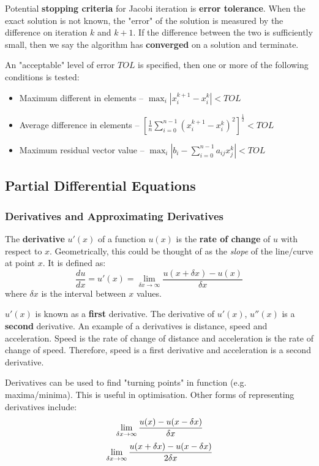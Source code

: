 \documentclass{article}
\begin{document}
Potential \textbf{stopping criteria} for Jacobi iteration is \textbf{error tolerance}. When the exact solution is not known, the "error" of the solution is measured by the difference on iteration $k$ and $k+1$. If the difference between the two is sufficiently small, then we say the algorithm has \textbf{converged} on a solution and terminate.

An "acceptable" level of error $TOL$ is specified, then one or more of the following conditions is tested:
\begin{itemize}
	\item Maximum different in elements -- $\max_{i} |x_i^{k+1} - x_i^k| < TOL$
	\item Average difference in elements -- $[\frac{1}{n} \sum_{i=0}^{n - 1} (x_i^{k + 1} - x_i^k)^2 ]^{\frac{1}{2}} < TOL$
	\item Maximum residual vector value -- $\max_{i} |b_i - \sum_{i=0}^{n - 1} { a_{ij}x_j^k } | < TOL$
\end{itemize}

\subsection{Partial Differential Equations}

\subsubsection{Derivatives and Approximating Derivatives}
The \textbf{derivative} $u'(x)$ of a function $u(x)$ is the \textbf{rate of change} of $u$ with respect to $x$. Geometrically, this could be thought of as the \textit{slope} of the line/curve at point $x$. It is defined as:
\begin{equation}
	\frac{du}{dx} = u'(x) = \lim_{\delta x \rightarrow \infty} \frac{u(x + \delta x) - u(x)}{\delta x}
	\label{eq:derivative1}
\end{equation}
where $\delta x$ is the interval between $x$ values.

$u'(x)$ is known as a \textbf{first} derivative. The derivative of $u'(x)$, $u''(x)$  is a \textbf{second} derivative. An example of a derivatives is distance, speed and acceleration. Speed is the rate of change of distance and acceleration is the rate of change of speed. Therefore, speed is a first derivative and acceleration is a second derivative.

Derivatives can be used to find "turning points" in function (e.g. maxima/minima). This is useful in optimisation.  Other forms of representing derivatives include:
\begin{equation}\\
	\lim_{\delta x \rightarrow \infty} \frac{u(x) - u(x - \delta x)}{\delta x}
	\label{eq:derivative2}
\end{equation}
\begin{equation}\\
	\lim_{\delta x \rightarrow \infty} \frac{u(x + \delta x) - u(x - \delta x)}{2\delta x} \\
	\label{eq:derivative3}
\end{equation}
\end{document}
